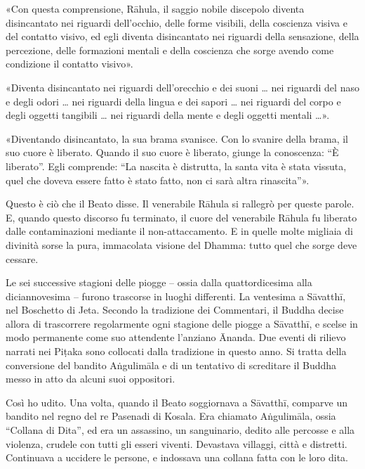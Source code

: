  «Con questa comprensione, Rāhula, il saggio nobile discepolo
diventa disincantato nei riguardi dell’occhio, delle forme visibili, della
coscienza visiva e del contatto visivo, ed egli diventa disincantato nei
riguardi della sensazione, della percezione, delle formazioni mentali e della
coscienza che sorge avendo come condizione il contatto visivo».

«Diventa disincantato nei riguardi dell’orecchio e dei suoni … nei riguardi del
naso e degli odori … nei riguardi della lingua e dei sapori … nei riguardi del
corpo e degli oggetti tangibili … nei riguardi della mente e degli oggetti
mentali …».

«Diventando disincantato, la sua brama svanisce. Con lo svanire della brama, il
suo cuore è liberato. Quando il suo cuore è liberato, giunge la conoscenza: “È
liberato”. Egli comprende: “La nascita è distrutta, la santa vita è stata
vissuta, quel che doveva essere fatto è stato fatto, non ci sarà altra
rinascita”».

Questo è ciò che il Beato disse. Il venerabile Rāhula si rallegrò per queste
parole. E, quando questo discorso fu terminato, il cuore del venerabile Rāhula
fu liberato dalle contaminazioni mediante il non-attaccamento. E in quelle molte
migliaia di divinità sorse la pura, immacolata visione del Dhamma: tutto quel
che sorge deve cessare.


 Le sei successive stagioni delle piogge – ossia
dalla quattordicesima alla diciannovesima – furono trascorse in luoghi
differenti. La ventesima a Sāvatthī, nel Boschetto di Jeta. Secondo la
tradizione dei Commentari, il Buddha decise allora di trascorrere regolarmente
ogni stagione delle piogge a Sāvatthī, e scelse in modo permanente come suo
attendente l’anziano Ānanda. Due eventi di rilievo narrati nei Piṭaka sono
collocati dalla tradizione in questo anno. Si tratta della conversione del
bandito Aṅgulimāla e di un tentativo di screditare il Buddha messo in atto da
alcuni suoi oppositori.

 Così ho udito. Una volta, quando il Beato soggiornava a
Sāvatthī, comparve un bandito nel regno del re Pasenadi di Kosala. Era chiamato
Aṅgulimāla, ossia “Collana di Dita”, ed era un assassino, un sanguinario, dedito
alle percosse e alla violenza, crudele con tutti gli esseri viventi. Devastava
villaggi, città e distretti. Continuava a uccidere le persone, e indossava una
collana fatta con le loro dita.

